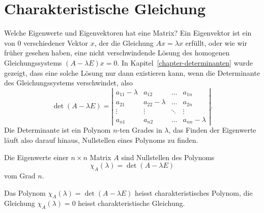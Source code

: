%
%
%
\section{Charakteristische Gleichung}
Welche Eigenwerte und Eigenvektoren hat eine Matrix? Ein Eigenvektor
ist ein von $0$ verschiedener Vektor $x$, der die Gleichung
$Ax=\lambda x$ erfüllt, oder wie wir früher gesehen haben,
eine nicht verschwindende Lösung des homogenen Gleichungssystems
$(A-\lambda E)x=0$.
In Kapitel~\ref{chapter-determinanten} wurde gezeigt, dass eine solche
Lösung nur dann existieren kann, wenn die Determinante des Gleichungssystems
verschwindet, also
\[
\det(A-\lambda E)=
\left|
\begin{matrix}
a_{11}-\lambda&a_{12}&\dots&a_{1n}\\
a_{21}&a_{22}-\lambda&\dots&a_{2n}\\
\vdots&\vdots&\ddots&\vdots\\
a_{n1}&a_{n2}&\dots&a_{nn}-\lambda
\end{matrix}
\right|.
\]
Die Determinante ist ein Polynom $n$-ten Grades in $\lambda$, das Finden der
Eigenwerte läuft also darauf hinaus, Nullstellen eines Polynoms zu finden.
\begin{satz}
Die Eigenwerte einer $n\times n$ Matrix $A$ sind Nullstellen des
Polynoms
\[
\chi_A(\lambda)=\det(A-\lambda E)
\]
vom Grad $n$.
\end{satz}
\begin{definition}
Das Polynom $\chi_A(\lambda)=\det(A-\lambda E)$ heisst
charakteristisches Polynom,
die Gleichung $\chi_A(\lambda)=0$ heisst
charakteristische Gleichung.
\end{definition}

